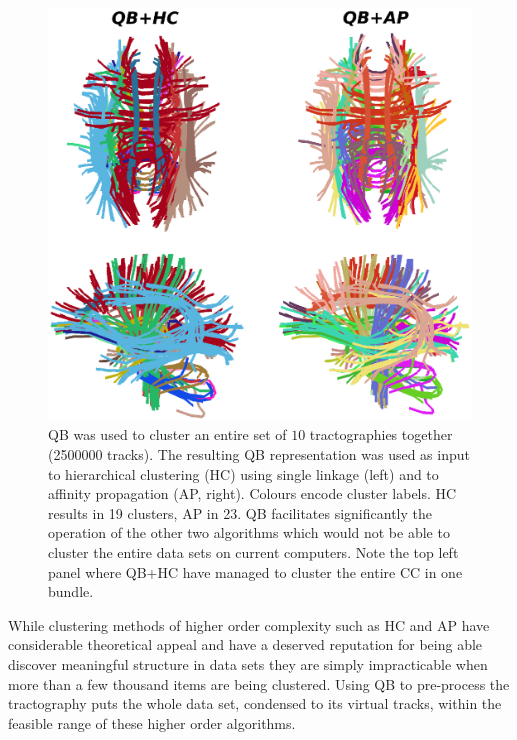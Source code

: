 \documentclass{bioinfo}
\begin{document}
\begin{figure}
\begin{centering}
\includegraphics[scale=0.6]{Figures/Fig_8_QB_with_others}
\par\end{centering}
\caption{QB was used to cluster an entire set of $10$ tractographies
  together (\num{2500000} tracks). The resulting QB representation was used as
  input to hierarchical clustering (HC) using single linkage (left)
  and to affinity propagation (AP, right). Colours encode cluster
  labels. HC results in 19 clusters, AP in 23. QB facilitates
  significantly the operation of the other two algorithms which would
  not be able to cluster the entire data sets on current computers. Note
  the top left panel where QB+HC have managed to cluster the entire CC
  in one bundle.\label{Flo:LSC+HC+AP}}
\end{figure}

While clustering methods of higher order complexity such as HC and AP
have considerable theoretical appeal and have a deserved reputation for
being able discover meaningful structure in data sets they are simply
impracticable when more than a few thousand items are being
clustered. Using QB to pre-process the tractography puts the whole data
set, condensed to its virtual tracks, within the feasible range of these
higher order algorithms.
\end{document}
